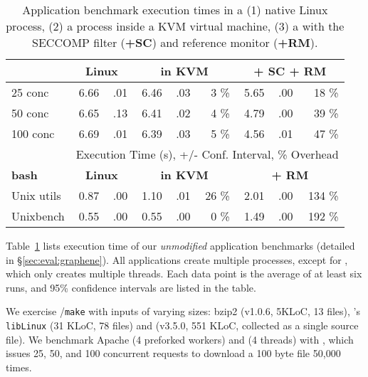 \begin{table}[t!b!]
\begin{tabular}{|l|rr|rrr|rrr|}
		{\bf \lighttpd{}} & \multicolumn{2}{c|}{\bf Linux} & \multicolumn{3}{c|}{{\bf in KVM}} & \multicolumn{3}{c|}{{\bf \graphene{} + SC + RM}} \\
		\hline
		
		25 conc    & 6.66 &.01 &6.46 &.03 &3 \% &5.65 &.00 &18 \%  \\\hline
		50 conc    & 6.65 &.13 &6.41 &.02 &4 \% &4.79 &.00 &39 \%  \\\hline
		100 conc   & 6.69 &.01 &6.39 &.03 &5 \% &4.56 &.01 &47 \%  \\\hline
		
		\hline\hline
		
		& \multicolumn{8}{c|}{Execution Time (s), +/- Conf. Interval, \% Overhead} \\
		\hline
		{\bf bash } & \multicolumn{2}{c|}{\bf Linux} & \multicolumn{3}{c|}{{\bf in KVM}} & \multicolumn{3}{c|}{{\bf \graphene{} + RM}} \\
		\hline
		
		Unix utils & 0.87 & .00 & 1.10 & .01 & 26 \% & 2.01 & .00 & 134 \%  \\\hline
		Unixbench  & 0.55 & .00 & 0.55 & .00 &  0 \% & 1.49 & .00 & 192 \%  \\\hline
	\end{tabular}
	\caption[Application benchmark results in Linux, KVM and \graphene{}]
	{Application benchmark execution times in a (1) native Linux process, (2) a process inside a KVM virtual machine, (3) a \graphene{} \picoproc{} with the SECCOMP filter ({\bf +SC}) and reference monitor ({\bf +RM}). }
	\label{tab:graphene:apps}
\end{table}



Table~\ref{tab:graphene:apps} lists 
execution time of our {\em unmodified} 
application benchmarks (detailed in \S\ref{sec:eval:graphene}).
All applications create multiple processes,
except for \lighttpd{}, which only creates multiple threads.
Each data point is the average of at least six runs, 
and 95\% confidence intervals are listed in the table.

We exercise  {\tt \gcc{}}/{\tt make}
with inputs of varying sizes:
bzip2 (v1.0.6, 5KLoC, 13 files),
\graphene{}'s {\tt libLinux} (31 KLoC, 78 files)
and \gcc{} (v3.5.0, 551 KLoC, collected as a single source file). 
We benchmark Apache (4 preforked workers) and \lighttpd{} (4 threads) with 
\ab{},
which issues 25, 50, and 100 concurrent requests
to download a 100 byte file 50,000 times.

